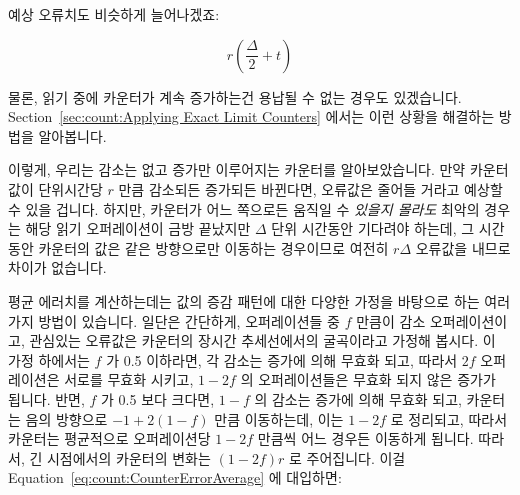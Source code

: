 \begin{lineref}
{	예상 오류치도 비슷하게 늘어나겠죠:

	\begin{equation}
		r \left( \frac{\Delta}{2} + t \right)
	\end{equation}

	물론, 읽기 중에 카운터가 계속 증가하는건 용납될 수 없는 경우도
	있겠습니다.
	Section~\ref{sec:count:Applying Exact Limit Counters}
	에서는 이런 상황을 해결하는 방법을 알아봅니다.

	이렇게, 우리는 감소는 없고 증가만 이루어지는 카운터를 알아보았습니다.
	만약 카운터 값이 단위시간당 $r$ 만큼 감소되든 증가되든 바뀐다면,
	오류값은 줄어들 거라고 예상할 수 있을 겁니다.
	하지만, 카운터가 어느 쪽으로든 움직일 수 \emph{있을지 몰라도} 최악의
	경우는 해당 읽기 오퍼레이션이 금방 끝났지만 $\Delta$ 단위 시간동안
	기다려야 하는데, 그 시간 동안 카운터의 값은 같은 방향으로만 이동하는
	경우이므로 여전히 $r \Delta$ 오류값을 내므로 차이가 없습니다.

	평균 에러치를 계산하는데는 값의 증감 패턴에 대한 다양한 가정을 바탕으로
	하는 여러가지 방법이 있습니다.
	일단은 간단하게, 오퍼레이션들 중 $f$ 만큼이 감소 오퍼레이션이고,
	관심있는 오류값은 카운터의 장시간 추세선에서의 굴곡이라고 가정해
	봅시다.
	이 가정 하에서는 $f$ 가 0.5 이하라면, 각 감소는 증가에 의해 무효화
	되고, 따라서 $2f$ 오퍼레이션은 서로를 무효화 시키고, $1-2f$ 의
	오퍼레이션들은 무효화 되지 않은 증가가 됩니다.
	반면, $f$ 가 0.5 보다 크다면, $1-f$ 의 감소는 증가에 의해 무효화 되고,
	카운터는 음의 방향으로 $-1+2\left(1-f\right)$ 만큼 이동하는데, 이는
	$1-2f$ 로 정리되고, 따라서 카운터는 평균적으로 오퍼레이션당 $1-2f$
	만큼씩 어느 경우든 이동하게 됩니다.
	따라서, 긴 시점에서의 카운터의 변화는 $\left( 1-2f \right) r$ 로
	주어집니다.
	이걸 Equation~\ref{eq:count:CounterErrorAverage} 에 대입하면:
	\iffalse

}
\end{lineref}
